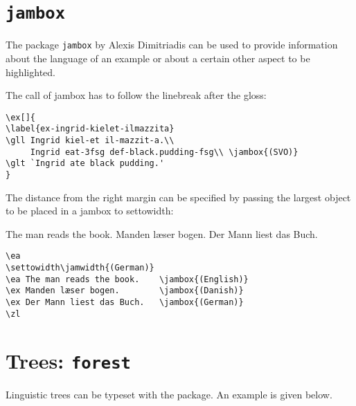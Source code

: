 \def\exfont{\normalsize\upshape}

\section{\texttt{jambox}}
\label{sec-jambox}


The package \texttt{jambox} by Alexis Dimitriadis can be used to provide information about the language of an example or
about a certain other aspect to be highlighted.
\settowidth{}
\eal
{}
\zl

The call of {\bs}jambox has to follow the linebreak after the gloss:
\begin{verbatim}
\ex[]{
\label{ex-ingrid-kielet-ilmazzita}
\gll Ingrid kiel-et il-mazzit-a.\\
     Ingrid eat-3fsg def-black.pudding-fsg\\ \jambox{(SVO)}
\glt `Ingrid ate black pudding.'
}
\end{verbatim}
The distance from the right margin can be specified by passing the largest object to be placed in a
jambox to {\bs}settowidth:

\ea 
\settowidth{}
  \ea The man reads the book.    
  \ex Manden læser bogen.        
  \ex Der Mann liest das Buch.   
  \z 
\z

\begin{verbatim}
\ea 
\settowidth\jamwidth{(German)}
\ea The man reads the book.    \jambox{(English)}
\ex Manden læser bogen.        \jambox{(Danish)}
\ex Der Mann liest das Buch.   \jambox{(German)}
\zl
\end{verbatim}



\section{Trees: \texttt{forest}}
Linguistic trees can be typeset with the  package. An example is given below.

